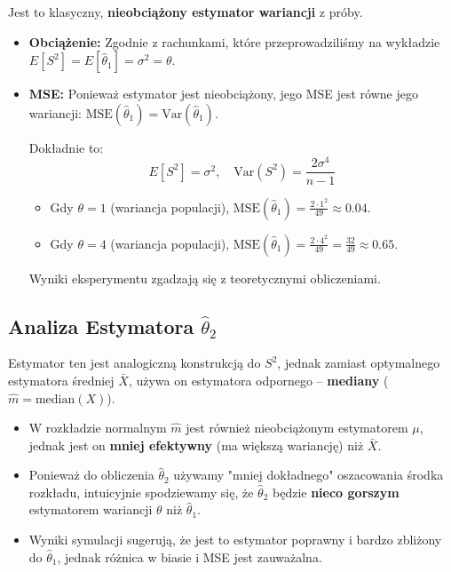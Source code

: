 \documentclass[a4paper,12pt]{article}
\begin{document}
Jest to klasyczny, \textbf{nieobciążony estymator wariancji} z próby.
\begin{itemize}
    \item \textbf{Obciążenie:} Zgodnie z rachunkami, które przeprowadziliśmy na wykładzie $E[S^2] = E[\hat{\theta}_1] = \sigma^2 = \theta$. 

    \item \textbf{MSE:} Ponieważ estymator jest nieobciążony, jego MSE jest równe jego wariancji: $\text{MSE}(\hat{\theta}_1) = \text{Var}(\hat{\theta}_1)$.

    Dokładnie to:
    \[
        \boxed{
            E[S^2] = \sigma^2, \quad \mathrm{Var}(S^2) = \frac{2\sigma^4}{n-1}
        }       
    \]
    \begin{itemize}
        \item Gdy $\theta = 1$ (wariancja populacji), $\text{MSE}(\hat{\theta}_1) = \frac{2 \cdot 1^2}{49} \approx 0.04$.
        \item Gdy $\theta = 4$ (wariancja populacji), $\text{MSE}(\hat{\theta}_1) = \frac{2 \cdot 4^2}{49} = \frac{32}{49} \approx 0.65$.
    \end{itemize}
    Wyniki eksperymentu zgadzają się z teoretycznymi obliczeniami.

\end{itemize}

\subsection*{Analiza Estymatora $\hat{\theta}_2$}

Estymator ten jest analogiczną konstrukcją do $S^2$, jednak zamiast optymalnego estymatora średniej $\bar{X}$, używa on estymatora odpornego -- \textbf{mediany} ($\hat{m} = \text{median}(X)$).
\begin{itemize}
    \item W rozkładzie normalnym $\hat{m}$ jest również nieobciążonym estymatorem $\mu$, jednak jest on \textbf{mniej efektywny} (ma większą wariancję) niż $\bar{X}$.
    \item Ponieważ do obliczenia $\hat{\theta}_2$ używamy "mniej dokładnego" oszacowania środka rozkładu, intuicyjnie spodziewamy się, że $\hat{\theta}_2$ będzie \textbf{nieco gorszym} estymatorem wariancji $\theta$ niż $\hat{\theta}_1$.
    \item Wyniki symulacji sugerują, że jest to estymator poprawny i bardzo zbliżony do $\hat{\theta}_1$, jednak różnica w biasie i MSE jest zauważalna.
\end{itemize}
\end{document}
